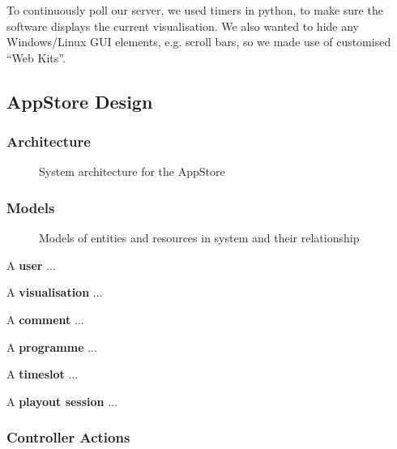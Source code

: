 \documentclass[a4paper, titlepage]{article}
\begin{document}
To continuously poll our server, we used timers in python, to make sure the software displays the 
current visualisation. We also wanted to hide any Windows/Linux GUI elements, e.g. scroll bars, so we 
made use of customised ``Web Kits''.


\subsection{AppStore Design}


\subsubsection{Architecture}

\begin{figure}[ht]
  \centering
  \caption{System architecture for the AppStore}
  \label{fig:impl_models}
\end{figure}


\subsubsection{Models}

\begin{figure}[ht]
  \centering
  \caption{Models of entities and resources in system and their relationship}
  \label{fig:impl_models}
\end{figure}


A \textbf{user} ...

A \textbf{visualisation} ...

A \textbf{comment} ...

A \textbf{programme} ...

A \textbf{timeslot} ...

A \textbf{playout session} ...


\subsubsection{Controller Actions}
\end{document}
